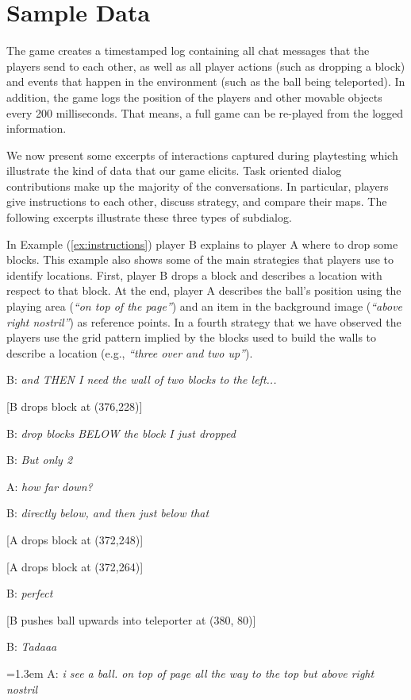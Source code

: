 \section{Sample Data}

The game creates a timestamped log containing all chat messages that
the players send to each other, as well as all player actions (such as
dropping a block) and events that happen in the environment (such as
the ball being teleported). In addition, the game logs the position of
the players and other movable objects every 200 milliseconds. That
means, a full game can be re-played from the logged information.

We now present some excerpts of interactions captured during
playtesting which illustrate the kind of data that our game
elicits. Task oriented dialog contributions make up the majority of
the conversations. In particular, players give instructions to each
other, discuss strategy, and compare their maps. The following
excerpts illustrate these three types of subdialog. 

In Example
(\ref{ex:instructions}) player B explains to player A where to drop
some blocks. This example also shows some of the main strategies that
players use to identify locations. First, player B drops a block and
describes a location with respect to that block. At the end, player A
describes the ball's position using the playing area (\textit{``on top
  of the page''}) and an item in the background image (\textit{``above
  right nostril''}) as reference points. In a fourth strategy that we
have observed the players use the grid pattern implied by the blocks
used to build the walls to describe a location (e.g., \textit{``three
  over and two up''}).

{\footnotesize
\begin{example}
\parbox[t]{0.9\columnwidth}{
B: \textit{and THEN I need the wall of two blocks to the left...}

\strut[B drops block at (376,228)]

B: \textit{drop blocks BELOW the block I just dropped}

B: \textit{But only 2}

A: \textit{how far down?}

B: \textit{directly below, and then just below that}

\strut[A drops block at (372,248)]
\strut[A drops block at (372,264)]

B: \textit{perfect}

\strut[B pushes ball upwards into teleporter at (380, 80)]

B: \textit{Tadaaa}

\hangindent=1.3em A: \textit{i see a ball.  on top of page all the way to the top but
  above right nostril}
}
\label{ex:instructions}
\end{example}
}

